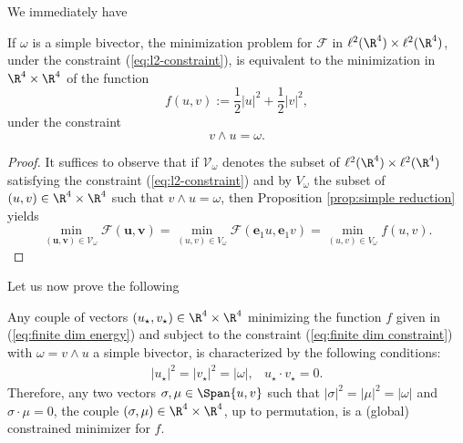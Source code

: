 We immediately have

\begin{corollary}
\label{cor:simple reduction}
If $\omega$ is a simple bivector, the minimization problem for $\mathcal{F}$ in $\ell^2(\R^4) \times \ell^2(\R^4)$, under the constraint (\ref{eq:l2-constraint}), is equivalent to the minimization in $\R^4 \times \R^4$ of the function
\begin{equation}
\label{eq:finite dim energy}
 	f(u,v) := \frac{1}{2}|u|^2 + \frac{1}{2} |v|^2,
 \end{equation} 
 under the constraint
 \begin{equation}
 \label{eq:finite dim constraint}
 v \wedge u = \omega.
 \end{equation}
\end{corollary}

\begin{proof}
It suffices to observe that if $\mathcal{V}_{\omega}$ denotes the subset of $\ell^2(\R^4) \times \ell^2(\R^4)$ satisfying the constraint (\ref{eq:l2-constraint}) and by $V_{\omega}$ the subset of $(u, v)  \in \R^4 \times \R^4$ such that $v \wedge u = \omega$, then Proposition \ref{prop:simple reduction} yields
\begin{equation}
\min_{(\mathbf{u}, \mathbf{v}) \in \mathcal{V}_{\omega}}\mathcal{F}(\mathbf{u}, \mathbf{v}) = \min_{(u, v) \in V_\omega} \mathcal{F}(\mathbf{e}_1 u, \mathbf{e}_1 v) = \min_{(u,v) \in V_{\omega}} f(u,v).
\end{equation}
\end{proof}

Let us now prove the following


\begin{proposition}
\label{prop:finite dim minimization}
Any couple of vectors $(u_{\star}, v_{\star}) \in \R^4 \times \R^4$ minimizing the function $f$ given in (\ref{eq:finite dim energy}) and subject to the constraint (\ref{eq:finite dim constraint}) with $\omega = v \wedge u$ a simple bivector, is characterized by the following conditions:
\begin{eqnarray}
\label{eq:finite dim minimization conditions}
|u_{\star}|^2 = |v_{\star}|^2 = |\omega|, & 
u_{\star} \cdot v_{\star} = 0.
\end{eqnarray}
Therefore, any two vectors $\sigma, \mu \in \Span\{u, v\}$ such that $|\sigma|^2 = |\mu|^2 =|\omega|$ and $\sigma \cdot \mu = 0$, the couple $(\sigma, \mu) \in \R^4 \times \R^4$, up to permutation, is a (global) constrained minimizer for $f$.
\end{proposition}

